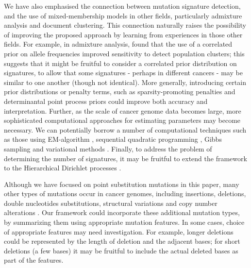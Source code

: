 \documentclass[10pt,letterpaper]{article}
\begin{document}
We have also emphasised the connection between mutation
signature detection, and the use of mixed-membership models
in other fields, particularly admixture analysis and document clustering.  This connection naturally raises the possibility of improving the proposed approach by learning from experiences in those other fields. For example, in admixture analysis, \cite{pmid12930761} found that the use of a correlated
prior on allele frequencies improved sensitivity to detect
population clusters; this suggests that it might be fruitful to consider a correlated prior distribution on signatures, to allow that some signatures - perhaps in different cancers - may be similar to one another (though not identical).
More generally, introducing certain prior distributions or penalty terms, such as sparsity-promoting penalties \cite{hoyer2004non, engelhardt2010analysis} and determinantal point process priors \cite{kulesza2012determinantal, kwok2012priors}
could improve both accuracy and interpretation.
Further, as the scale of cancer genome data becomes large,
more sophisticated computational approaches for estimating parameters may become necessary. We can potentially borrow a number of computational techniques such as those using EM-algorithm \cite{Hofmann:1999, tang2005estimation},
sequential quadratic programming \cite{zhou2011quasi}, Gibbs sampling \cite{pmid10835412,pmid14872004} 
and variational methods \cite{Blei:2003,teh2006collapsed,raj2014variational}.
Finally, to address the problem of determining the number of signatures, it may be fruitful to extend the framework to  
the Hierarchical Dirichlet processes \cite{teh2006hierarchical}.

Although we have focused on point substitution mutations in this paper, 
many other types of mutations occur in cancer genomes, 
including insertions, deletions, double nucleotides substitutions, structural variations and copy number alterations \cite{meyerson2010advances, helleday2014mechanisms}.
Our framework could incorporate these additional mutation types, by 
summarizing them using appropriate mutation features.
In some cases, choice of appropriate features may need investigation. 
For example, longer deletions could be represented by the length of deletion and the adjacent bases; 
for short deletions (a few bases) it may be fruitful to include the actual deleted bases as part of the features.
\end{document}
